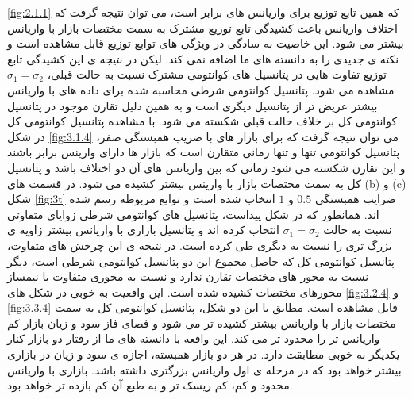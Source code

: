 \documentclass[a4paper,titlepage,12pt,fleqn,oneside]{report}
\begin{document}
\ref{fig:2.1.1}
که همین تابع توزیع برای واریانس های برابر است، می توان نتیجه گرفت که اختلاف واریانس باعث کشیدگی تابع توزیع مشترک به سمت مختصات بازار با واریانس بیشتر می شود. این خاصیت به سادگی در ویژگی های توابع توزیع قابل مشاهده است و نکته ی جدیدی را به دانسته های ما اضافه نمی کند. لیکن در نتیجه ی این کشیدگی تابع توزیع تفاوت هایی در پتانسیل های کوانتومی مشترک نسبت به حالت قبلی،
$\sigma_1 =\sigma_2$
مشاهده می شود. پتانسیل کوانتومی شرطی محاسبه شده برای داده های با واریانس بیشتر عریض تر از پتانسیل دیگری است و به همین دلیل تقارن موجود در پتانسیل کوانتومی کل بر خلاف حالت قبلی شکسته می شود. با مشاهده پتانسیل کوانتومی کل در شکل
\ref{fig:3.1.4}
می توان نتیجه گرفت که برای بازار های با ضریب همبستگی صفر، پتانسیل کوانتومی تنها و تنها زمانی متقارن است که بازار ها دارای وارینس برابر باشند و این تقارن شکسته می شود زمانی که بین واریانس های آن دو اختلاف باشد و پتانسیل کل به سمت مختصات بازار با وارینس بیشتر کشیده می شود.
در قسمت های (b) و (c)  شکل
\ref*{fig:3t}
ضرایب همبستگی 
$0.5$
و
$1$
انتخاب شده است و توابع مربوطه رسم شده اند. همانطور که در شکل پیداست، پتانسیل های کوانتومی شرطی زوایای متفاوتی نسبت به حالت 
$\sigma_1 =\sigma_2$
انتخاب کرده اند و پتانسیل بازاری با واریانس بیشتر زاویه ی بزرگ تری را نسبت به دیگری طی کرده است. در نتیجه ی این چرخش های متفاوت، پتانسیل کوانتومی کل که حاصل مجموع این دو پتانسیل کوانتومی شرطی است، دیگر نسبت به محور های مختصات تقارن ندارد و نسبت به محوری متفاوت با نیمساز محورهای مختصات کشیده شده است. این واقعیت به خوبی در شکل های 
\ref{fig:3.2.4}
و 
\ref{fig:3.3.4}
قابل مشاهده است. مطابق با این دو شکل، پتانسیل کوانتومی کل به سمت مختصات بازار با واریانس بیشتر کشیده تر می شود و فضای فاز سود و زیان بازار کم واریانس تر را محدود تر می کند. این واقعه با دانسته های ما از رفتار دو بازار کنار یکدیگر به خوبی مطابقت دارد. در هر دو بازار همبسته، اجازه ی سود و زیان در بازاری بیشتر خواهد بود که در مرحله ی اول واریانس بزرگتری داشته باشد. بازاری با واریانس محدود و کم، کم ریسک تر و به طبع آن کم بازده تر خواهد بود. 
\end{document}
